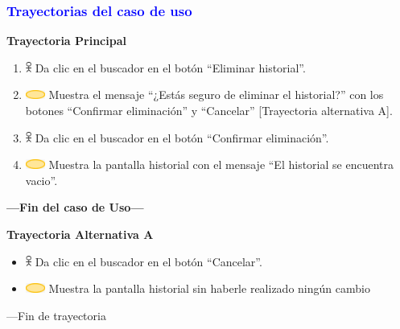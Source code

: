\subsubsection{\textcolor{blue}{Trayectorias del caso de uso}}

\textbf{Trayectoria Principal}
\begin{enumerate}
    \item \includegraphics[width=0.0150\textwidth]{Figuras/persona.png} Da clic en el buscador en el botón “Eliminar historial”.
    \item \includegraphics[width=0.0500\textwidth]{Figuras/sistema.png} Muestra el mensaje “¿Estás seguro de eliminar el historial?” con los botones “Confirmar eliminación” y “Cancelar” [Trayectoria alternativa A].
    \item \includegraphics[width=0.0150\textwidth]{Figuras/persona.png} Da clic en el buscador en el botón “Confirmar eliminación”.
    \item \includegraphics[width=0.0500\textwidth]{Figuras/sistema.png} Muestra la pantalla historial con el mensaje “El historial se encuentra vacio”.
\end{enumerate}
\textbf{---Fin del caso de Uso---}
\vspace{15pt}

\textbf{Trayectoria Alternativa A}
\begin{itemize}
    \item \includegraphics[width=0.0150\textwidth]{Figuras/persona.png} Da clic en el buscador en el botón “Cancelar”.
    \item \includegraphics[width=0.0500\textwidth]{Figuras/sistema.png} Muestra la pantalla historial sin haberle realizado ningún cambio
    
\end{itemize}
---Fin de trayectoria

